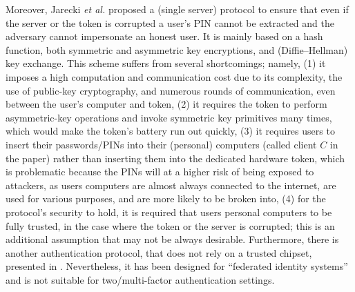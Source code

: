 \begin{enumerate}
Moreover, Jarecki \textit{et al.} \cite{JareckiJKSS21} proposed a (single server) protocol to ensure that even if the server or the token is corrupted a user's PIN cannot be extracted and the adversary cannot impersonate an honest user. It is mainly based on a hash function, both symmetric and asymmetric key encryptions, and (Diffie–Hellman) key exchange. This scheme suffers from several shortcomings; namely, (1) it imposes a high computation and communication cost due to its complexity,  the use of public-key cryptography, and numerous rounds of communication, even between the user's computer and token, (2) it requires the token to perform asymmetric-key operations and invoke symmetric key primitives many times, which would make the token's battery run out quickly, (3) it requires users to insert their passwords/PINs into their (personal) computers (called client $C$ in the paper) rather than inserting them into the dedicated hardware token, which is problematic because the PINs will at a higher risk of being exposed to attackers, as users computers are almost always connected to the internet, are used for various purposes, and are more likely to be broken into, (4) for the protocol's security to hold, it is required that users personal computers to be fully trusted, in the case where the token or the server is corrupted; this is an additional assumption that may not be always desirable. %
%
%
Furthermore, there is another authentication protocol, that does not rely on a trusted chipset, presented in \cite{zhang2020strong}. Nevertheless, it has been designed for ``federated identity systems'' and is not suitable for two/multi-factor authentication settings. 








\end{enumerate}
